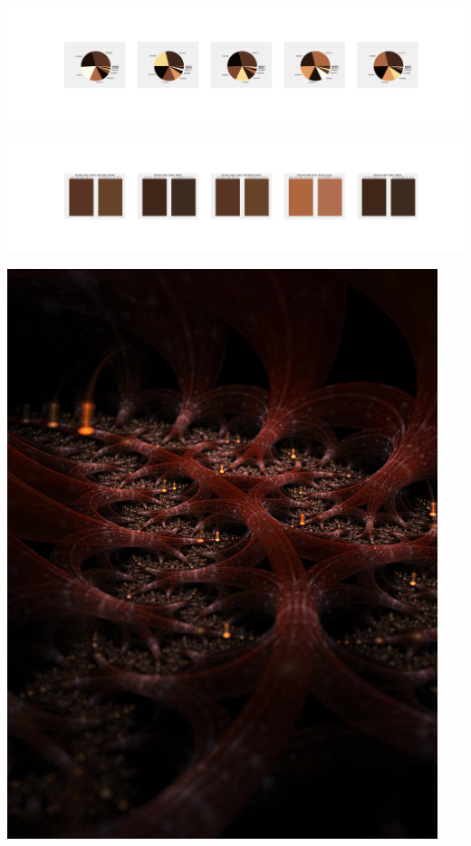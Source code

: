 \documentclass[11pt]{article}
\begin{document}
\begin{landscape}
    \begin{center}
    \includegraphics[width=250mm]{./nbimg/pie-403.jpg}
    \end{center}

    \begin{center}
    \includegraphics[width=250mm]{./nbimg/peak-403.jpg}
    \end{center}
    

    \begin{center}
    \includegraphics[width=\textwidth]{./nbimg/file (57).jpg}
    \end{center}


\end{landscape}
\end{document}
